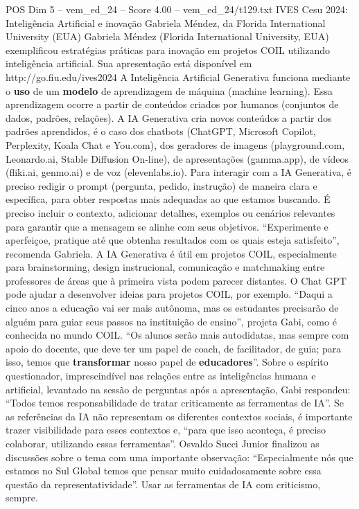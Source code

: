 \begin{textsample}{POS Dim 5 – vem\_ed\_24 – Score 4.00 – vem\_ed\_24/t129.txt}  \label{ex:f5_pos_016}
IVES Cesu 2024: Inteligência Artificial e inovação Gabriela Méndez, da Florida International University (EUA) Gabriela Méndez (Florida International University, EUA) exemplificou estratégias práticas para inovação em projetos COIL utilizando inteligência artificial.
Sua apresentação está disponível em http://go.fiu.edu/ives2024 A Inteligência Artificial Generativa funciona mediante o \textbf{uso} de um \textbf{modelo} de aprendizagem de máquina (machine learning).
Essa aprendizagem ocorre a partir de conteúdos criados por humanos (conjuntos de dados, padrões, relações).
A IA Generativa cria novos conteúdos a partir dos padrões aprendidos, é o caso dos chatbots (ChatGPT, Microsoft Copilot, Perplexity, Koala Chat e You.com), dos geradores de imagens (playground.com, Leonardo.ai, Stable Diffusion On-line), de apresentações (gamma.app), de vídeos (fliki.ai, genmo.ai) e de voz (elevenlabs.io).
Para interagir com a IA Generativa, é preciso redigir o prompt (pergunta, pedido, instrução) de maneira clara e específica, para obter respostas mais adequadas ao que estamos buscando.
É preciso incluir o contexto, adicionar detalhes, exemplos ou cenários relevantes para garantir que a mensagem se alinhe com seus objetivos. “Experimente e aperfeiçoe, pratique até que obtenha resultados com os quais esteja satisfeito”, recomenda Gabriela.
A IA Generativa é útil em projetos COIL, especialmente para brainstorming, design instrucional, comunicação e matchmaking entre professores de áreas que à primeira vista podem parecer distantes.
O Chat GPT pode ajudar a desenvolver ideias para projetos COIL, por exemplo. “Daqui a cinco anos a educação vai ser mais autônoma, mas os estudantes precisarão de alguém para guiar seus passos na instituição de ensino”, projeta Gabi, como é conhecida no mundo COIL. “Os alunos serão mais autodidatas, mas sempre com apoio do docente, que deve ter um papel de coach, de facilitador, de guia; para isso, temos que \textbf{transformar} nosso papel de \textbf{educadores}”.
Sobre o espírito questionador, imprescindível nas relações entre as inteligências humana e artificial, levantado na sessão de perguntas após a apresentação, Gabi respondeu: “Todos temos responsabilidade de tratar criticamente as ferramentas de IA”.
Se as referências da IA não representam os diferentes contextos sociais, é importante trazer visibilidade para esses contextos e, “para que isso aconteça, é preciso colaborar, utilizando essas ferramentas”.
Osvaldo Succi Junior finalizou as discussões sobre o tema com uma importante observação: “Especialmente nós que estamos no Sul Global temos que pensar muito cuidadosamente sobre essa questão da representatividade”.
Usar as ferramentas de IA com criticismo, sempre.

\end{textsample}
